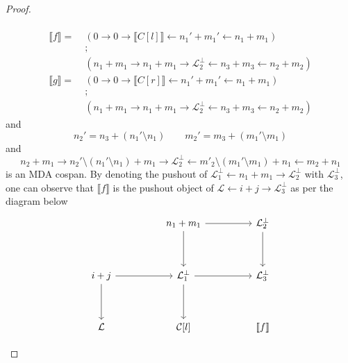 \begin{proof}
\begin{itemize}
\begin{align*}
                \end{align*}
            \else
            \begin{align*}
            \llbracket f \rrbracket = \;
            &(0 \to 0 \to \llbracket C[l] \rrbracket \xleftarrow{} n_1' + m_1' \xleftarrow{} n_1 + m_1)\\
            &;\\
            &(n_1 + m_1 \xrightarrow{} n_1 + m_1 \xrightarrow{} \mathcal{L}_2^{\bot} \xleftarrow{} n_3 + m_3 \xleftarrow{} n_2 + m_2)\\
            \llbracket g \rrbracket = \;
            &(0 \to 0 \to \llbracket C[r] \rrbracket \xleftarrow{} n_1' + m_1' \xleftarrow{} n_1 + m_1)\\
            &;\\
            &(n_1 + m_1 \xrightarrow{} n_1 + m_1 \xrightarrow{} \mathcal{L}_2^{\bot} \xleftarrow{} n_3 + m_3 \xleftarrow{} n_2 + m_2)
            \end{align*}
            \fi
            and
            \[
                n_2' = n_3 + (n_1' \setminus n_1) \qquad m_2' = m_3 + (m_1' \setminus m_1)
            \]
            and
            \[
            n_2 + m_1 \xrightarrow{} n_2' \setminus (n_1' \setminus n_1) + m_1 \xrightarrow{} \mathcal{L}_{2}^{\bot} \xleftarrow{} m'_2 \setminus (m_1' \setminus m_1) + n_1 \xleftarrow{} m_2 + n_1    
            \] is an MDA cospan.
            By denoting the pushout of $\mathcal{L}_1^{\bot} \xleftarrow{} n_1 + m_1 \xrightarrow{} \mathcal{L}_{2}^{\bot}$ with $\mathcal{L}_3^{\bot}$,
            one can observe that $\llbracket f \rrbracket$ is the pushout object of $\mathcal{L} \xleftarrow{} i+j \xrightarrow{} \mathcal{L}_{3}^{\bot}$ as per the diagram below
            \[\begin{tikzcd}
                && {n_1+m_1} && {\mathcal{L}^{\bot}_2} \\
                \\
                {i+j} && {\mathcal{L}^{\bot}_1} && {\mathcal{L}^{\bot}_3} \\
                \\
                {\mathcal{L}} && {\mathcal{C}[l]} && {\llbracket f \rrbracket}
                \arrow[from=1-3, to=1-5]
                \arrow[from=1-3, to=3-3]
                \arrow[from=1-5, to=3-5]
                \arrow[from=3-1, to=3-3]
                \arrow[from=3-1, to=5-1]
                \arrow[from=3-3, to=3-5]
                \arrow[from=3-3, to=5-3]

\end{tikzcd}\]
\end{itemize}
\end{proof}
